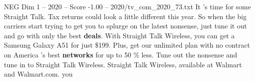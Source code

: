\begin{textsample}{NEG Dim 1 – 2020 – Score -1.00 – 2020/tv\_com\_2020\_73.txt}  \label{ex:f1_neg_013}
It 's time for some Straight Talk.
Tax returns could look a little different this year.
So when the big carriers start trying to get you to splurge on the latest nonsense, just tune it out and go with only the best \textbf{deals}.
With Straight Talk Wireless, you can get a Samsung Galaxy A51 for just \$199.
Plus, get our unlimited plan with no contract on America 's best \textbf{networks} for up to 50 \% less.
Tune out the nonsense and tune in to Straight Talk Wireless.
Straight Talk Wireless, available at Walmart and Walmart.com. you

\end{textsample}
